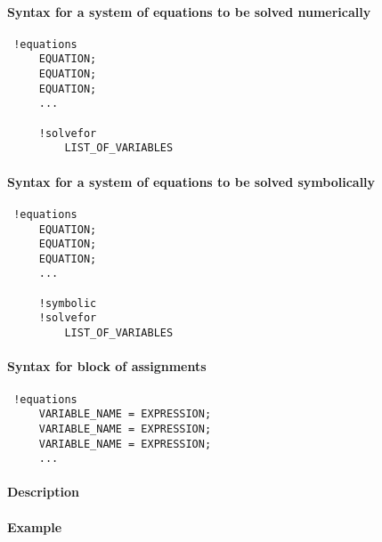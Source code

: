 


	\paragraph{Syntax for a system of equations to be solved numerically}
 
 \begin{verbatim}
 !equations
     EQUATION;
     EQUATION;
     EQUATION;
     ...
 
     !solvefor
         LIST_OF_VARIABLES
 \end{verbatim}
 
 \paragraph{Syntax for a system of equations to be solved symbolically}
 
 \begin{verbatim}
 !equations
     EQUATION;
     EQUATION;
     EQUATION;
     ...
 
     !symbolic
     !solvefor
         LIST_OF_VARIABLES
 \end{verbatim}
 
 \paragraph{Syntax for block of assignments}
 
 \begin{verbatim}
 !equations
     VARIABLE_NAME = EXPRESSION;
     VARIABLE_NAME = EXPRESSION;
     VARIABLE_NAME = EXPRESSION;
     ...
 \end{verbatim}
 
 \paragraph{Description}
 
 \paragraph{Example}


